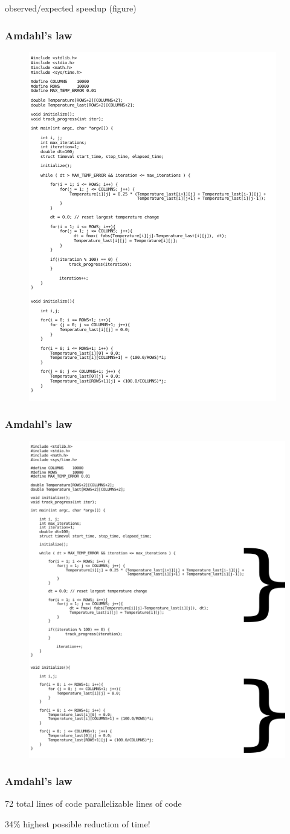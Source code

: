\begin{frame}
		observed/expected speedup (figure)
\end{frame}

\begin{frame}
		\frametitle{Amdahl's law}
		\begin{figure}
				\includegraphics[width=0.4\linewidth]{figures/diagrams/amdahl/code}
		\end{figure}
\end{frame}

\begin{frame}
		\frametitle{Amdahl's law}
		\begin{figure}
				\includegraphics[width=0.4\linewidth]{figures/diagrams/amdahl/parallelblocks}
		\end{figure}
\end{frame}

\begin{frame}
		\frametitle{Amdahl's law}
		72 total lines of code  parallelizable lines of code\newline

		\color{red}34\% highest possible reduction of time!
\end{frame}

